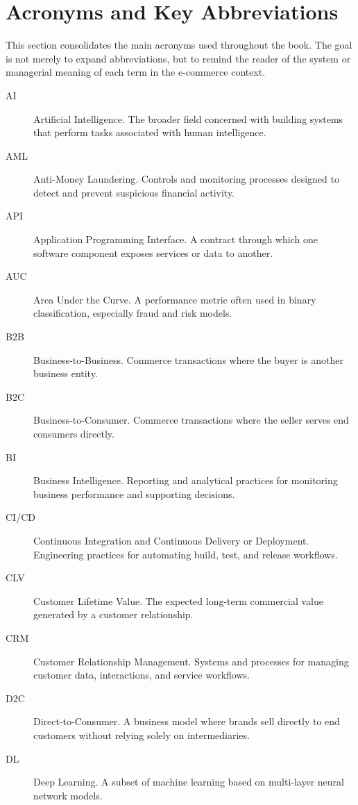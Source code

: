 \chapter*{Acronyms and Key Abbreviations}

This section consolidates the main acronyms used throughout the book. The goal is not merely to expand abbreviations, but to remind the reader of the system or managerial meaning of each term in the e-commerce context.

\begin{description}
  \item[AI] Artificial Intelligence. The broader field concerned with building systems that perform tasks associated with human intelligence.
  \item[AML] Anti-Money Laundering. Controls and monitoring processes designed to detect and prevent suspicious financial activity.
  \item[API] Application Programming Interface. A contract through which one software component exposes services or data to another.
  \item[AUC] Area Under the Curve. A performance metric often used in binary classification, especially fraud and risk models.
  \item[B2B] Business-to-Business. Commerce transactions where the buyer is another business entity.
  \item[B2C] Business-to-Consumer. Commerce transactions where the seller serves end consumers directly.
  \item[BI] Business Intelligence. Reporting and analytical practices for monitoring business performance and supporting decisions.
  \item[CI/CD] Continuous Integration and Continuous Delivery or Deployment. Engineering practices for automating build, test, and release workflows.
  \item[CLV] Customer Lifetime Value. The expected long-term commercial value generated by a customer relationship.
  \item[CRM] Customer Relationship Management. Systems and processes for managing customer data, interactions, and service workflows.
  \item[D2C] Direct-to-Consumer. A business model where brands sell directly to end customers without relying solely on intermediaries.
  \item[DL] Deep Learning. A subset of machine learning based on multi-layer neural network models.

\end{description}
